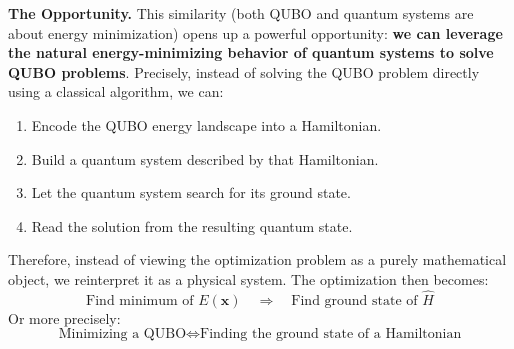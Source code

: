 \highspace
\textcolor{Green3}{ \textbf{The Opportunity.}} This similarity (both QUBO and quantum systems are about energy minimization) opens up a powerful opportunity: \textbf{we can leverage the natural energy-minimizing behavior of quantum systems to solve QUBO problems}. Precisely, instead of solving the QUBO problem directly using a classical algorithm, we can:
\begin{enumerate}
    \item Encode the QUBO energy landscape into a Hamiltonian.
    \item Build a quantum system described by that Hamiltonian.
    \item Let the quantum system search for its ground state.
    \item Read the solution from the resulting quantum state.
\end{enumerate}
Therefore, instead of viewing the optimization problem as a purely mathematical object, we reinterpret it as a physical system. The optimization then becomes:
\begin{equation*}
    \text{Find minimum of } E(\mathbf{x}) \quad \Rightarrow \quad \text{Find ground state of } \hat{H}
\end{equation*}
Or more precisely:
\begin{equation*}
    \text{Minimizing a QUBO} \iff \text{Finding the ground state of a Hamiltonian}
\end{equation*}